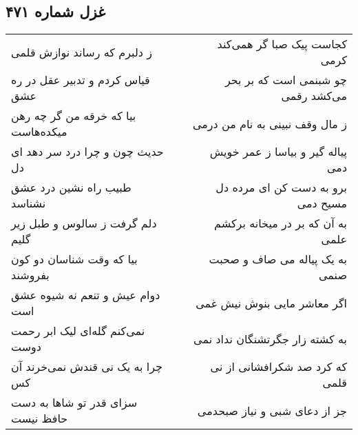 \begin{center}
\section*{غزل شماره ۴۷۱}
\label{sec:sh471}
\begin{longtable}{l p{0.5cm} r}
ز دلبرم که رساند نوازش قلمی
&&
کجاست پیک صبا گر همی‌کند کرمی
\\
قیاس کردم و تدبیر عقل در ره عشق
&&
چو شبنمی است که بر بحر می‌کشد رقمی
\\
بیا که خرقه من گر چه رهن میکده‌هاست
&&
ز مال وقف نبینی به نام من درمی
\\
حدیث چون و چرا درد سر دهد ای دل
&&
پیاله گیر و بیاسا ز عمر خویش دمی
\\
طبیب راه نشین درد عشق نشناسد
&&
برو به دست کن ای مرده دل مسیح دمی
\\
دلم گرفت ز سالوس و طبل زیر گلیم
&&
به آن که بر در میخانه برکشم علمی
\\
بیا که وقت شناسان دو کون بفروشند
&&
به یک پیاله می صاف و صحبت صنمی
\\
دوام عیش و تنعم نه شیوه عشق است
&&
اگر معاشر مایی بنوش نیش غمی
\\
نمی‌کنم گله‌ای لیک ابر رحمت دوست
&&
به کشته زار جگرتشنگان نداد نمی
\\
چرا به یک نی قندش نمی‌خرند آن کس
&&
که کرد صد شکرافشانی از نی قلمی
\\
سزای قدر تو شاها به دست حافظ نیست
&&
جز از دعای شبی و نیاز صبحدمی
\\
\end{longtable}
\end{center}

